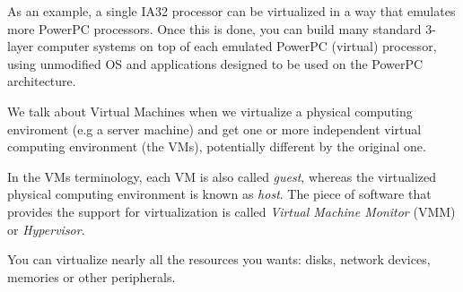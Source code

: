 As an example, a single IA32 processor can be virtualized in a way that emulates more PowerPC processors. Once this is done, you
can build many standard 3-layer computer systems on top of each emulated PowerPC (virtual) processor, using unmodified OS and 
applications designed to be used on the PowerPC architecture.

\vspace{0.5cm}

We talk about Virtual Machines when we virtualize a physical computing enviroment (e.g a server machine) and get one or more 
independent virtual computing environment (the VMs), potentially different by the original one.

In the VMs terminology, each VM is also called \emph{guest}, whereas the virtualized physical computing environment is known as
\emph{host}.
The piece of software that provides the support for virtualization is called \emph{Virtual Machine Monitor} (VMM) or \emph{Hypervisor}.

You can virtualize nearly all the resources you wants: disks, network devices, memories or other peripherals.

\vspace{0.5cm}

